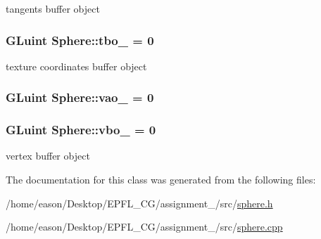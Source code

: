 tangents buffer object 

\subsubsection[{\texorpdfstring{tbo\+\_\+}{tbo_}}]{\setlength{\rightskip}{0pt plus 5cm}G\+Luint Sphere\+::tbo\+\_\+ = 0\hspace{0.3cm}{\ttfamily [private]}}\hypertarget{classSphere_aa118703b30e8488d50354ff41a0b9ad7}{}\label{classSphere_aa118703b30e8488d50354ff41a0b9ad7}


texture coordinates buffer object 

\subsubsection[{\texorpdfstring{vao\+\_\+}{vao_}}]{\setlength{\rightskip}{0pt plus 5cm}G\+Luint Sphere\+::vao\+\_\+ = 0\hspace{0.3cm}{\ttfamily [private]}}\hypertarget{classSphere_a4e5466159b070fdb71874ef3545fa7d7}{}\label{classSphere_a4e5466159b070fdb71874ef3545fa7d7}
\subsubsection[{\texorpdfstring{vbo\+\_\+}{vbo_}}]{\setlength{\rightskip}{0pt plus 5cm}G\+Luint Sphere\+::vbo\+\_\+ = 0\hspace{0.3cm}{\ttfamily [private]}}\hypertarget{classSphere_a6200722a6dc9a6205c05928815baeeb2}{}\label{classSphere_a6200722a6dc9a6205c05928815baeeb2}


vertex buffer object 



The documentation for this class was generated from the following files\+:\begin{DoxyCompactItemize}
\item 
/home/eason/\+Desktop/\+E\+P\+F\+L\+\_\+\+C\+G/assignment\+\_/src/\hyperlink{sphere_8h}{sphere.\+h}\item 
/home/eason/\+Desktop/\+E\+P\+F\+L\+\_\+\+C\+G/assignment\+\_/src/\hyperlink{sphere_8cpp}{sphere.\+cpp}\end{DoxyCompactItemize}
